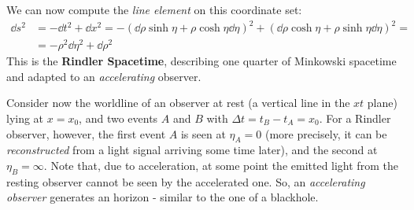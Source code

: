 \documentclass[../template.tex]{subfiles}
\begin{document}
We can now compute the \textit{line element} on this coordinate set:
\begin{align*}
    \dd{s}^2 &= -\dd{t}^2 + \dd{x}^2 = - (\dd{\rho} \sinh \eta + \rho\cosh \eta \dd{\eta} )^2 + (\dd{\rho} \cosh \eta + \rho \sinh \eta \dd{\eta})^2 =\\
    &= -\rho^2 \dd{\eta}^2 + \dd{\rho}^2
\end{align*} 
This is the \textbf{Rindler Spacetime}, describing one quarter of Minkowski spacetime and adapted to an \textit{accelerating} observer.

Consider now the worldline of an observer at rest (a vertical line in the $xt$ plane) lying at $x=x_0$, and two events $A$ and $B$ with $\Delta t = t_B - t_A = x_0$. For a Rindler observer, however, the first event $A$ is seen at $\eta_A = 0$ (more precisely, it can be \textit{reconstructed} from a light signal arriving some time later), and the second at $\eta_B = \infty$. Note that, due to acceleration, at some point the emitted light from the resting observer cannot be seen by the accelerated one. So, an \textit{accelerating observer} generates an horizon - similar to the one of a blackhole.  
\end{document}
